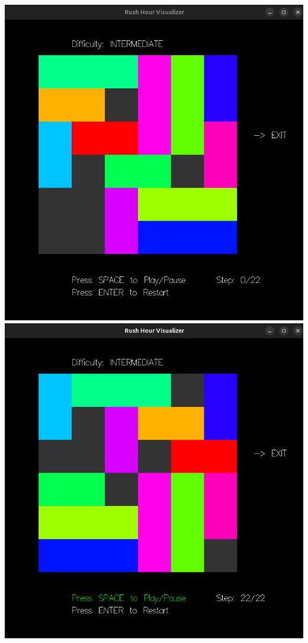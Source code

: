 \documentclass{article}
\begin{document}
\begin{center}
  \includegraphics[scale=0.3]{visualizer1.png} \hspace{1cm}
  \includegraphics[scale=0.3]{visualizer2.png}
\end{center}
\end{document}
